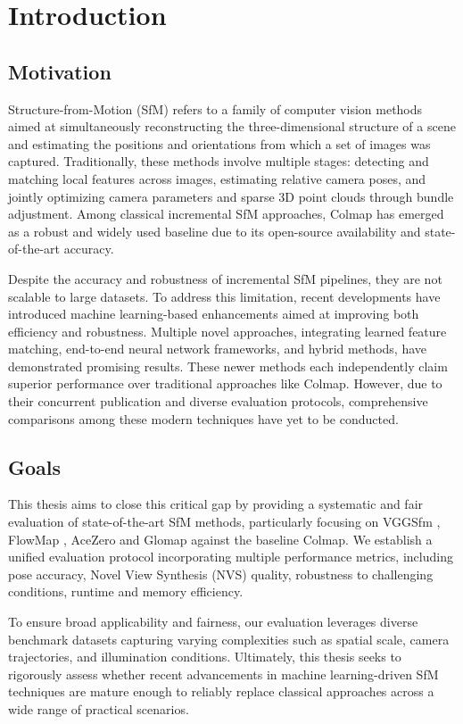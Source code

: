 \chapter{Introduction}\label{chap:introduction}

\section{Motivation}

Structure-from-Motion (SfM) refers to a family of computer vision methods aimed at simultaneously reconstructing the three-dimensional structure of a scene and estimating the positions and orientations from which a set of images was captured. 
Traditionally, these methods involve multiple stages: detecting and matching local features across images, estimating relative camera poses, and jointly optimizing camera parameters and sparse 3D point clouds through bundle adjustment. 
Among classical incremental SfM approaches, Colmap \cite{schoenberger2016sfm} has emerged as a robust and widely used baseline due to its open-source availability and state-of-the-art accuracy.

Despite the accuracy and robustness of incremental SfM pipelines, they are not scalable to large datasets.
To address this limitation, recent developments have introduced machine learning-based enhancements aimed at improving both efficiency and robustness. 
Multiple novel approaches, integrating learned feature matching, end-to-end neural network frameworks, and hybrid methods, have demonstrated promising results. 
These newer methods each independently claim superior performance over traditional approaches like Colmap. However, due to their concurrent publication and diverse evaluation protocols, comprehensive comparisons among these modern techniques have yet to be conducted.

\section{Goals}

This thesis aims to close this critical gap by providing a systematic and fair evaluation of state-of-the-art SfM methods, particularly focusing on VGGSfm \cite{wang2023vggsfm}, FlowMap \cite{smith24flowmap}, AceZero \cite{brachmann2024acezero} and Glomap \cite{pan2024glomap} against the baseline Colmap.
We establish a unified evaluation protocol incorporating multiple performance metrics, including pose accuracy, Novel View Synthesis (NVS) quality, robustness to challenging conditions, runtime and memory efficiency.

To ensure broad applicability and fairness, our evaluation leverages diverse benchmark datasets capturing varying complexities such as spatial scale, camera trajectories, and illumination conditions. 
Ultimately, this thesis seeks to rigorously assess whether recent advancements in machine learning-driven SfM techniques are mature enough to reliably replace classical approaches across a wide range of practical scenarios.
